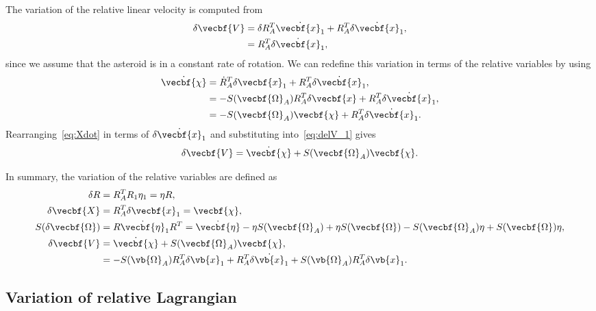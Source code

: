 \documentclass[11pt, reqno]{article}    %
\begin{document}
The variation of the relative linear velocity is computed from 
\begin{align}\label{eq:delV_1}
    \delta \vecbf{V} &= \delta R_A^T \dot{\vecbf{x}_1} + R_A^T \delta \dot{\vecbf{x}}_1 , \nonumber \\
    &= R_A^T \delta \dot{\vecbf{x}}_1 ,
\end{align}
since we assume that the asteroid is in a constant rate of rotation.
We can redefine this variation in terms of the relative variables by using
\begin{align}\label{eq:Xdot}
    \dot{\vecbf{\chi}} &= \dot{R}_A^T \delta \vecbf{x}_1 + R_A^T \delta \dot{\vecbf{x}}_1 , \nonumber \\
    &= -S(\vecbf{\Omega}_A) R_A^T \delta \vecbf{x} + R_A^T \delta \dot{\vecbf{x}}_1 ,\nonumber \\
    &= -S(\vecbf{\Omega}_A) \vecbf{\chi} + R_A^T \delta \dot{\vecbf{x}}_1 .
\end{align}
Rearranging~\cref{eq:Xdot} in terms of \( \delta \dot{\vecbf{x}}_1\) and substituting into~\cref{eq:delV_1} gives
\begin{align}\label{eq:relative_velocity_variation}
    \delta \vecbf{V} = \dot{\vecbf{\chi}} + S(\vecbf{\Omega}_A) \vecbf{\chi} .
\end{align}

In summary, the variation of the relative variables are defined as
\begin{align*}
    \delta R &= R_A^T R_1 \eta_1 = \eta R ,\\
    \delta \vecbf{X} &= R_A^T \delta \vecbf{x}_1 = \vecbf{\chi} , \\
    S(\delta \vecbf{\Omega}) &= R \dot{\vecbf{\eta}}_1 R^T = \dot{\vecbf{\eta}} - \eta S(\vecbf{\Omega}_A )  + \eta S(\vecbf{\Omega})  - S(\vecbf{\Omega}_A) \eta + S(\vecbf{\Omega}) \eta, \\
    \delta \vecbf{V} &= \dot{\vecbf{\chi}} + S(\vecbf{\Omega}_A) \vecbf{\chi} , \\
    &= -S(\vb{\Omega}_A) R_A^T \delta \vb{x}_1 + R_A^T \delta \dot{\vb{x}}_1 + S(\vb{\Omega}_A) R_A^T \delta \vb{x}_1.
\end{align*}
\subsection{Variation of relative Lagrangian}\label{ssec:var_rel_lagrangian}
\end{document}
